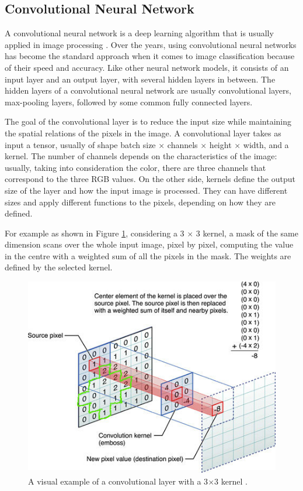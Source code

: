 \documentclass{usiinftr}
\begin{document}
\subsection{Convolutional Neural Network} 
A convolutional neural network is a deep learning algorithm that is usually applied in image processing \cite{13}.
Over the years, using convolutional neural networks has become the standard approach when it comes to image classification because of their speed and accuracy.
Like other neural network models, it consists of an input layer and an output layer, with several hidden layers in between.
The hidden layers of a convolutional neural network are usually convolutional layers, max-pooling layers, followed by some common fully connected layers.

The goal of the convolutional layer is to reduce the input size while maintaining the spatial relations of the pixels in the image. A convolutional layer takes as input a tensor, usually of shape batch size $\times$ channels $\times$ height $\times$ width, and a kernel. The number of channels depends on the characteristics of the image: usually, taking into consideration the color, there are three channels that correspond to the three RGB values. 
On the other side, kernels define the output size of the layer and how the input image is processed. They can have different sizes and apply different functions to the pixels, depending on how they are defined.

For example as shown in Figure \ref{fig:13}, considering a 3 $\times$ 3 kernel, a mask of the same dimension scans over the whole input image, pixel by pixel, computing the value in the centre with a weighted sum of all the pixels in the mask. The weights are defined by the selected kernel.

\begin{figure}[H]
	\centering
	\includegraphics[width=0.5\linewidth]{img/kernel}
	\caption{A visual example of a convolutional layer with a 3$\times$3 kernel \cite{14}.}
	\label{fig:13}
\end{figure}
\end{document}
